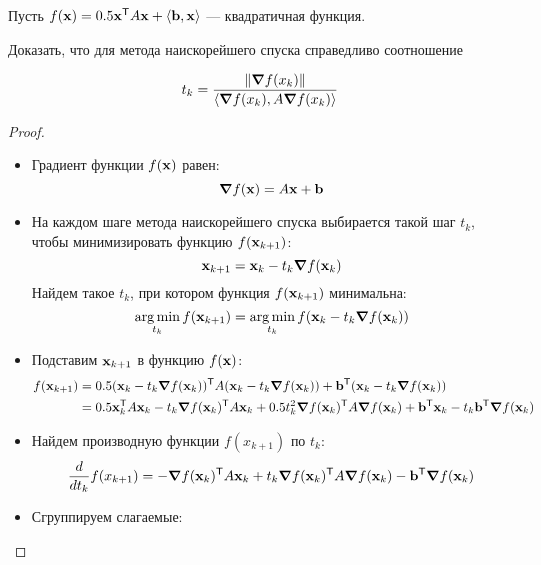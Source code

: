 \begin{problem}
Пусть $f(\vb{x}) = 0.5 \vb{x}^{\mathsf{T}} A \vb{x} + \left\langle \vb{b}, \vb{x} \right\rangle$ — квадратичная функция.

Доказать, что для метода наискорейшего спуска справедливо соотношение

\[
    t_k = \frac{\norm{\grad {f(x_k)}}}{\left\langle \grad{f(x_k)},  A \grad{ f(x_k)} \right\rangle}
\]
\end{problem}

\begin{proof}
    \
    \begin{itemize}
        \item Градиент функции $f(\vb{x})$ равен:
              \[
                  \grad{f(\vb{x})} = A\vb{x} + \vb{b}
              \]
        \item На каждом шаге метода наискорейшего спуска выбирается такой шаг $t_k$, чтобы минимизировать функцию $f(\vb{x}_{k+1})$:
              \[
                  \vb{x}_{k+1} = \vb{x}_k - t_k \grad{f(\vb{x}_k)}
              \]
              Найдем такое $t_k$, при котором функция $f(\vb{x}_{k+1})$ минимальна:
              \[
                  \operatorname*{arg\,min}_{t_k} f(\vb{x}_{k+1})
                  = \operatorname*{arg\,min}_{t_k} f(\vb{x}_k - t_k \grad{f(\vb{x}_k)})
              \]
        \item Подставим $\vb{x}_{k+1}$ в функцию $f(\vb{x})$:
              \[
                  \begin{aligned}
                      f(\vb{x}_{k+1})
                       & = 0.5 (\vb{x}_k - t_k \grad{f(\vb{x}_k)})^{\mathsf{T}} A (\vb{x}_k - t_k \grad{f(\vb{x}_k)})
                      + \vb{b}^{\mathsf{T}}(\vb{x}_k - t_k \grad{f(\vb{x}_k)})                                        \\
                       & = 0.5 \vb{x}_k^{\mathsf{T}} A \vb{x}_k
                      - t_k \grad{f(\vb{x}_k)}^{\mathsf{T}} A \vb{x}_k
                      + 0.5 t_k^2 \grad{f(\vb{x}_k)}^{\mathsf{T}} A \grad{f(\vb{x}_k)}
                      + \vb{b}^{\mathsf{T}} \vb{x}_k
                      - t_k \vb{b}^{\mathsf{T}} \grad{f(\vb{x}_k)}
                  \end{aligned}
              \]
        \item Найдем производную функции $f(x_{k+1})$ по $t_k$:
              \[
                  \dv{t_k} f(x_{k+1})
                  = - \grad{f(\vb{x}_k)}^{\mathsf{T}} A \vb{x}_k
                  + t_k \grad{f(\vb{x}_k)}^{\mathsf{T}} A \grad{f(\vb{x}_k)}
                  - \vb{b}^{\mathsf{T}} \grad{f(\vb{x}_k)}
              \]
        \item Сгруппируем слагаемые:

\end{itemize}
\end{proof}
